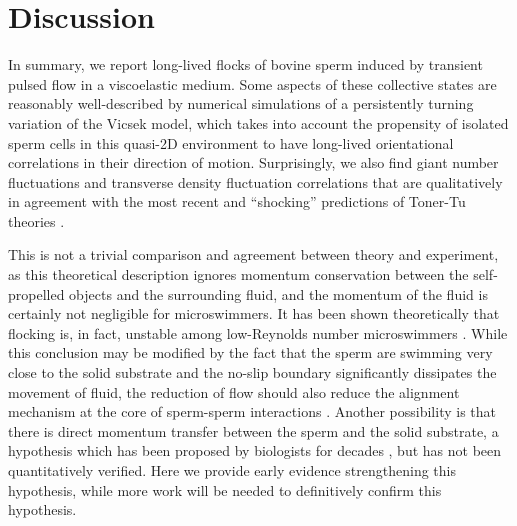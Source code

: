 \documentclass[reprint,unsortedaddress,amsmath,amssymb,aps,pre]{revtex4-2}
\begin{document}
\section{\label{Sec::Discussion}Discussion}

In summary, we report long-lived flocks of bovine sperm induced by transient pulsed flow in a viscoelastic medium. Some aspects of these collective states are reasonably well-described by numerical simulations of a persistently turning variation of the Vicsek model, which takes into account the propensity of isolated sperm cells in this quasi-2D environment to have long-lived orientational correlations in their direction of motion. Surprisingly, we also find giant number fluctuations and transverse density fluctuation correlations that are qualitatively in agreement with the most recent and ``shocking'' predictions of Toner-Tu theories \cite{toner2019giant}.

This is not a trivial comparison and agreement between theory and experiment, as this theoretical description ignores momentum conservation between the self-propelled objects and the surrounding fluid, and the momentum of the fluid is certainly not negligible for microswimmers. It has been shown theoretically that  flocking is, in fact, unstable among low-Reynolds number microswimmers \cite{Simha2002hydrodynamic}. While this conclusion may be modified by the fact that the sperm are swimming very close to the solid substrate \cite{Nosrati2015two} and the no-slip boundary significantly dissipates the movement of fluid, the reduction of flow should also reduce the alignment mechanism at the core of sperm-sperm interactions \cite{Ishimoto2018hydrodynamic}. Another possibility is that there is direct momentum transfer between the sperm and the solid substrate, a hypothesis which has been proposed by biologists for decades \cite{Phillips1972comparative}, but has not been quantitatively verified. Here we provide early evidence strengthening this hypothesis, while more work will be needed to definitively confirm this hypothesis.
\end{document}
